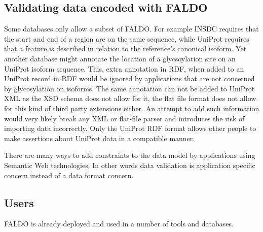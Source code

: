 \subsection*{Validating data encoded with FALDO}

Some databases only allow a subset of FALDO. 
For example INSDC requires that the start and end of a region are on the same sequence,
while UniProt requires that a feature is described in relation to the reference's canonical isoform.
Yet another database might annotate the location of a glycsoylation site on an UniProt isoform sequence.
This, extra annotation in RDF, when added to an UniProt record in RDF would be ignored by applications that are not concerned by glycosylation on isoforms.
The same annotation can not be added to UniProt XML as the XSD schema does not allow for it, the flat file format does not allow for this kind of third party extensions either.
An attempt to add such information would very likely break any XML or flat-file parser and introduces the risk of importing data incorrectly.
Only the UniProt RDF format allows other people to make assertions about UniProt data in a compatible manner.

There are many ways to add constraints to the data model by applications using Semantic Web technologies\cite{RDFValidationReport}.
In other words data validation is application specific concern instead of a data format concern.

\subsection*{Users}
FALDO is already deployed and used in a number of tools and databases.

